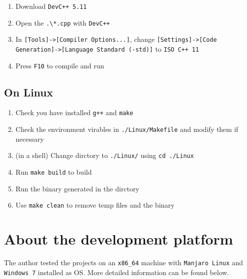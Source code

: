 \documentclass[cn,black,12pt,normal]{elegantnote}
\begin{document}
\begin{enumerate}
    \item Download \lstinline{DevC++ 5.11}
    \item Open the \lstinline{.\*.cpp} with \lstinline{DevC++}
    \item In \lstinline{[Tools]->[Compiler Options...]}, change \lstinline{[Settings]->[Code Generation]->[Language Standard (-std)]} to \lstinline{ISO C++ 11}
    \item Press \lstinline{F10} to compile and run
\end{enumerate}



\subsection{On Linux}

\begin{enumerate}
    \item Check you have installed \lstinline{g++} and \lstinline{make}
    \item Check the environment virables in \lstinline{./Linux/Makefile} and modify them if necessary
    \item (in a shell) Change dirctory to \lstinline{./Linux/} using \lstinline{cd ./Linux}
    \item Run \lstinline{make build} to build
    \item Run the binary generated in the dirctory
    \item Use \lstinline{make clean} to remove temp files and the binary
\end{enumerate}

\section{About the development platform}

The author tested the projects on an \lstinline{x86_64} machine with \lstinline{Manjaro Linux} and \lstinline{Windows 7} installed as OS. More detailed information can be found below.
\end{document}
